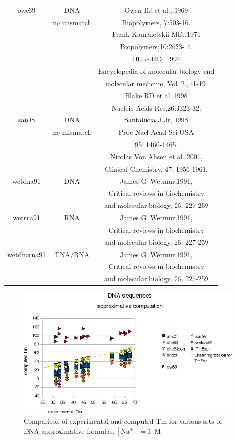 \documentclass{article}
\begin{document}
\begin{table}[h][c]
\begin{tabular}[h]{| c | c | c |}
 \hline
owe69 & DNA & Owen RJ et al., 1969\\
 & no mismatch & Biopolymers, 7:503-16. \\
 & & Frank-Kamenetskii MD.,1971 \\
 & & Biopolymers;10:2623- 4. \\
 & & Blake RD, 1996\\
 & & Encyclopedia of molecular biology and \\
 & & molecular medicine, Vol. 2., :1-19. \\
 & & Blake RD et al.,1998\\
 & & Nucleic Acids Res;26:3323-32. \\
 \hline
san98 & DNA & Santalucia J Jr, 1998\\
 & no mismatch & Proc Nacl Acad Sci USA \\
 & & 95, 1460-1465. \\
 & & Nicolas Von Ahsen et al. 2001, \\
 & & Clinical Chemistry, 47, 1956-1961. \\
 \hline
wetdna91 & DNA & James G. Wetmur,1991, \\
 & & Critical reviews in biochemistry \\
 & & and molecular biology, 26, 227-259 \\
 \hline
wetrna91 & RNA & James G. Wetmur,1991, \\
 & & Critical reviews in biochemistry \\
 & & and molecular biology, 26, 227-259 \\
 \hline
wetdnarna91 & DNA/RNA & James G. Wetmur,1991, \\
 & & Critical reviews in biochemistry \\
 & & and molecular biology, 26, 227-259 \\
 \hline
\end{tabular}
\end{table}
 
\begin{figure}[h]
\includegraphics[width=1\linewidth]{images/DNAApproximativeMode}
\caption{Comparison of experimental and computed Tm for various sets of
 DNA approximative formulas. $[\mbox{Na}^+] = 1$~M}
\end{figure}   
\end{document}
